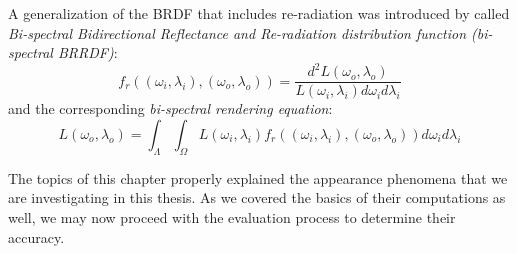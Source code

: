 A generalization of the BRDF that includes re-radiation was introduced by \citet{hullin2010acquisition} called \emph{Bi-spectral Bidirectional Reflectance and Re-radiation distribution function (bi-spectral BRRDF)}:
\begin{equation}
f_r((\omega_i,\lambda_i),(\omega_o,\lambda_o))=\frac{d^2L(\omega_o,\lambda_o)}{L(\omega_i,\lambda_i)d\omega_i d\lambda_i}
\end{equation}
and the corresponding \emph{bi-spectral rendering equation}:
\begin{equation}
L(\omega_o,\lambda_o)=\int_{\Lambda}\int_{\Omega}L(\omega_i,\lambda_i)f_r((\omega_i,\lambda_i),(\omega_o,\lambda_o))d\omega_i d\lambda_i
\end{equation}

The topics of this chapter properly explained the appearance phenomena that we are investigating in this thesis. As we covered the basics of their computations as well, we may now proceed with the evaluation process to determine their accuracy.